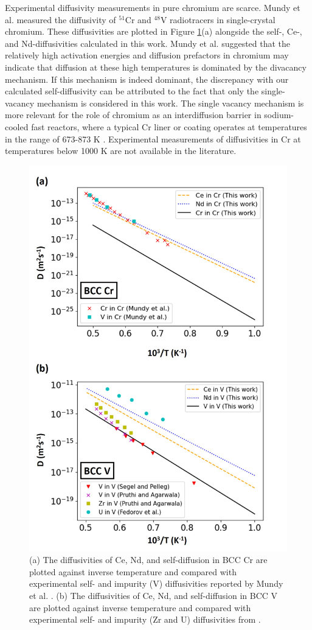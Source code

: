 \documentclass[preprint,12pt]{elsarticle}
\begin{document}
Experimental diffusivity measurements in pure chromium are scarce. Mundy et al. \cite{mundy1976isotope} measured the diffusivity of $^{51}$Cr and $^{48}$V radiotracers in single-crystal chromium. These diffusivities are plotted in Figure \ref{fig:diffusivities_vs_exp}(a) alongside the self-, Ce-, and Nd-diffusivities calculated in this work. Mundy et al. \cite{mundy1976isotope} suggested that the relatively high activation energies and diffusion prefactors in chromium may indicate that diffusion at these high temperatures is dominated by the divacancy mechanism. If this mechanism is indeed dominant, the discrepancy with our calculated self-diffusivity can be attributed to the fact that only the single-vacancy mechanism is considered in this work. The single vacancy mechanism is more relevant for the role of chromium as an interdiffusion barrier in sodium-cooled fast reactors, where a typical Cr liner or coating operates at temperatures in the range of 673-873 K \cite{beausoleil_fast_2022}. Experimental measurements of diffusivities in Cr at temperatures below 1000 K are not available in the literature.

\begin{figure}[htbp]
    \centering
    \includegraphics[width=0.825\linewidth]{experiments_cr_v.jpg}
    \caption{(a) The diffusivities of Ce, Nd, and self-diffusion in BCC Cr are plotted against inverse temperature and compared with experimental self- and impurity (V) diffusivities reported by Mundy et al. \cite{mundy1976isotope}. (b) The diffusivities of Ce, Nd, and self-diffusion in BCC V are plotted against inverse temperature and compared with experimental self- and impurity (Zr and U) diffusivities from \cite{segel1997vanadium, pruthi1984solute, fedorov1971diffusion}.}
    \label{fig:diffusivities_vs_exp}
\end{figure}
\end{document}
